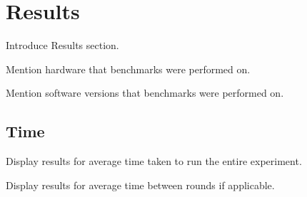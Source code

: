 \section{Results}

Introduce Results section.

Mention hardware that benchmarks were performed on.

Mention software versions that benchmarks were performed on.





\subsection{Time}

Display results for average time taken to run the entire experiment.

Display results for average time between rounds if applicable.


